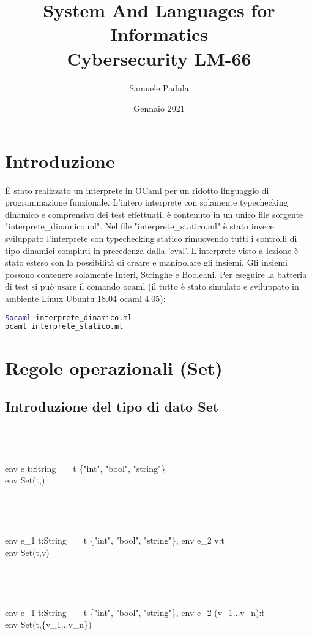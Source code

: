 \documentclass{article}
\title{%
  System And Languages for Informatics \\
  \large Cybersecurity LM-66}
\author{Samuele Padula}
\date{Gennaio 2021}
\begin{document}
\maketitle

\section{Introduzione}
È stato realizzato un interprete in OCaml per un ridotto linguaggio di programmazione funzionale. L’intero interprete con solamente typechecking dinamico e comprensivo dei test effettuati, è contenuto in un unico file sorgente "interprete\_dinamico.ml". Nel file "interprete\_statico.ml" è stato invece sviluppato l'interprete con typechecking statico rimuovendo tutti i controlli di tipo dinamici compiuti in precedenza dalla 'eval'.  L'interprete visto a lezione è stato esteso con la possibilità di creare e manipolare gli insiemi. Gli insiemi possono contenere solamente Interi, Stringhe e Booleani.
Per eseguire la batteria di test si può usare il comando ocaml (il tutto è stato simulato e sviluppato in ambiente Linux Ubuntu 18.04 ocaml 4.05):

\begin{lstlisting}[language=bash]
$ocaml interprete_dinamico.ml
ocaml interprete_statico.ml
\end{lstlisting}

\section{Regole operazionali (Set)}
\subsection{Introduzione del tipo di dato Set}
~\\~\\
\infr
  {\\env \vartriangleright{} e \implies t:String\ \ \ \ t \in \{"int", "bool", "string"\}}     
  {\\env \vartriangleright{}  \implies Set(t,\emptyset) }
~\\~\\~\\~\\
\infr
  {\\env \vartriangleright{} e_1 \implies t:String\ \ \ \ t \in \{"int", "bool", "string"\},  env \vartriangleright{} e_2 \implies v:t}     
  {\\env \vartriangleright{}  \implies Set(t,{v}) }  
~\\~\\~\\~\\
\infr
  {\\env \vartriangleright{} e_1 \implies t:String\ \ \ \ t \in \{"int", "bool", "string"\},  env \vartriangleright{} e_2 \implies (v_1...v_n):t}     
  {\\env \vartriangleright{}  \implies Set(t,\{v_1...v_n\}) }  
\end{document}
